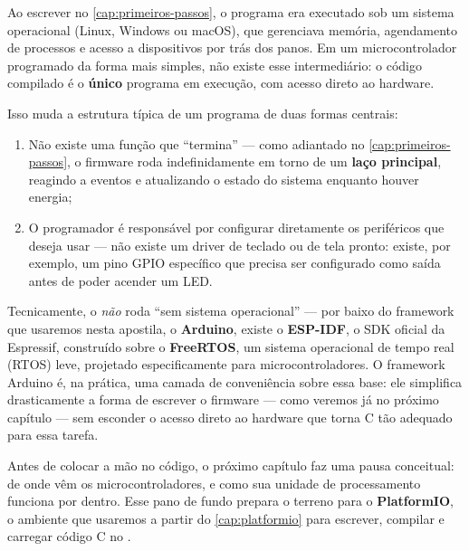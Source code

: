 Ao escrever  no \cref{cap:primeiros-passos}, o programa era executado sob um sistema operacional (Linux, Windows ou macOS), que gerenciava memória, agendamento de processos e acesso a dispositivos por trás dos panos. Em um microcontrolador programado da forma mais simples, não existe esse intermediário: o código compilado é o \textbf{único} programa em execução, com acesso direto ao hardware.

Isso muda a estrutura típica de um programa de duas formas centrais:

\begin{enumerate}
    \item Não existe uma função  que ``termina'' — como adiantado no \cref{cap:primeiros-passos}, o firmware roda indefinidamente em torno de um \textbf{laço principal}, reagindo a eventos e atualizando o estado do sistema enquanto houver energia;
    \item O programador é responsável por configurar diretamente os periféricos que deseja usar — não existe um driver de teclado ou de tela pronto: existe, por exemplo, um pino GPIO específico que precisa ser configurado como saída antes de poder acender um LED.
\end{enumerate}

\begin{esp32box}
Tecnicamente, o \ESP{} \emph{não} roda ``sem sistema operacional'' — por baixo do framework que usaremos nesta apostila, o \textbf{Arduino}, existe o \textbf{ESP-IDF}, o SDK oficial da Espressif, construído sobre o \textbf{FreeRTOS}, um sistema operacional de tempo real (RTOS) leve, projetado especificamente para microcontroladores. O framework Arduino é, na prática, uma camada de conveniência sobre essa base: ele simplifica drasticamente a forma de escrever o firmware — como veremos já no próximo capítulo — sem esconder o acesso direto ao hardware que torna C tão adequado para essa tarefa.
\end{esp32box}

Antes de colocar a mão no código, o próximo capítulo faz uma pausa conceitual: de onde vêm os microcontroladores, e como sua unidade de processamento funciona por dentro. Esse pano de fundo prepara o terreno para o \textbf{PlatformIO}, o ambiente que usaremos a partir do \cref{cap:platformio} para escrever, compilar e carregar código C no \ESP{}.
